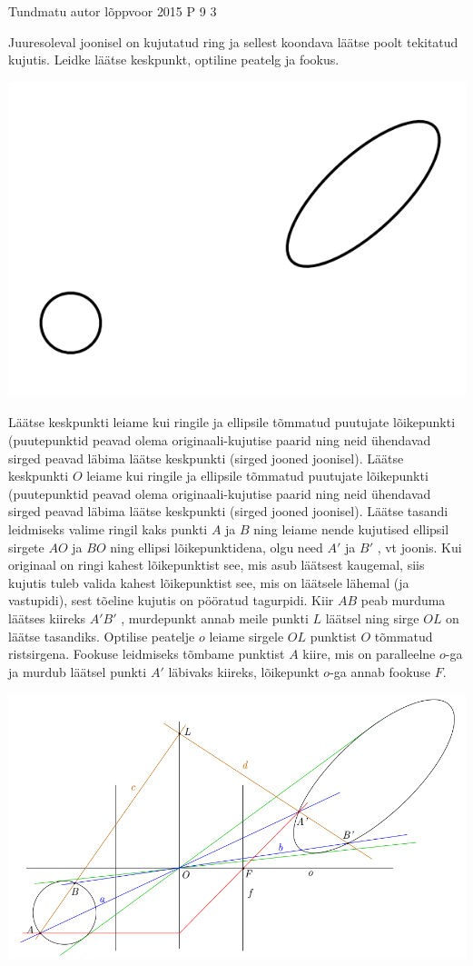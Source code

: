 {Tundmatu autor} %
{lõppvoor} %
{2015} %
{P 9} %
{3} %
{
\ifStatement
Juuresoleval joonisel on kujutatud ring ja sellest koondava läätse poolt tekitatud kujutis. Leidke läätse keskpunkt, optiline peatelg ja fookus.
\begin{center}
	\includegraphics[width=0.5\linewidth]{2015-v3p-09-yl.PNG}
\end{center}
\fi
\ifHint
Läätse keskpunkti leiame kui ringile ja ellipsile tõmmatud puutujate lõikepunkti (puutepunktid peavad olema originaali-kujutise paarid ning neid ühendavad sirged peavad läbima läätse keskpunkti (sirged jooned joonisel).
\fi
\ifSolution
Läätse keskpunkti $O$ leiame kui ringile ja ellipsile tõmmatud puutujate lõikepunkti (puutepunktid peavad olema originaali-kujutise paarid ning neid ühendavad sirged peavad läbima läätse keskpunkti (sirged jooned joonisel). Läätse tasandi leidmiseks valime ringil kaks punkti $A$ ja $B$ ning leiame nende kujutised ellipsil sirgete $AO$ ja $BO$ ning ellipsi lõikepunktidena, olgu need $A'$ ja $B'$ , vt joonis. Kui originaal on ringi kahest lõikepunktist see, mis asub läätsest kaugemal, siis kujutis tuleb valida kahest lõikepunktist see, mis on läätsele lähemal (ja vastupidi), sest tõeline kujutis on pööratud tagurpidi. Kiir $AB$ peab murduma läätses kiireks $A'B'$ , murdepunkt annab meile punkti $L$ läätsel ning sirge $OL$ on läätse tasandiks. Optilise peatelje $o$ leiame sirgele $OL$ punktist $O$ tõmmatud ristsirgena. Fookuse leidmiseks tõmbame punktist $A$ kiire, mis on paralleelne $o$-ga ja murdub läätsel punkti $A'$ läbivaks kiireks, lõikepunkt $o$-ga annab fookuse $F$.
\begin{center}
	\includegraphics[width=0.5\linewidth]{2015-v3p-09-lah.PNG}
\end{center}
\fi
}
